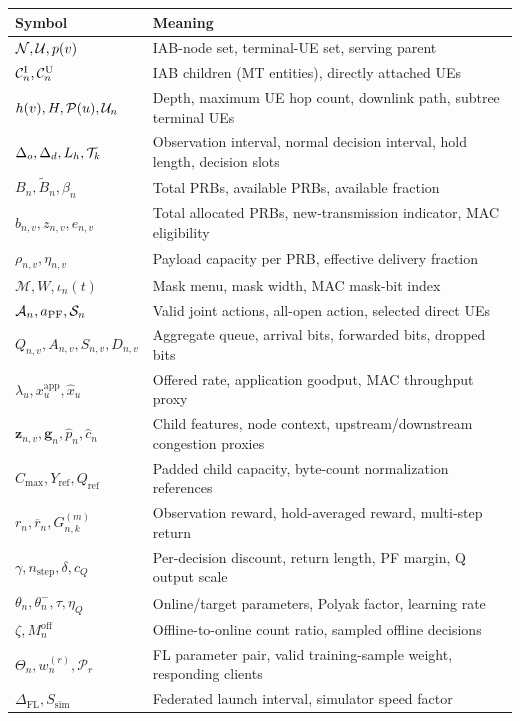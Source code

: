 \begin{EnChapter}
\begin{longtable}{@{}p{}p{}@{}}
\toprule
Symbol & Meaning \\
\midrule
\endhead
$\mathcal{N},\mathcal{U},p(v)$ & IAB-node set, terminal-UE set, serving parent \\
$\mathcal{C}_n^{\mathrm{I}},\mathcal{C}_n^{\mathrm{U}}$ & IAB children (MT entities), directly attached UEs \\
$h(v),H,\mathcal{P}(u),\mathcal{U}_n$ & Depth, maximum UE hop count, downlink path, subtree terminal UEs \\
$\Delta_o,\Delta_d,L_h,\mathcal{T}_k$ & Observation interval, normal decision interval, hold length, decision slots \\
$B_n,\tilde B_n,\beta_n$ & Total PRBs, available PRBs, available fraction \\
$b_{n,v},z_{n,v},e_{n,v}$ & Total allocated PRBs, new-transmission indicator, MAC eligibility \\
$\rho_{n,v},\eta_{n,v}$ & Payload capacity per PRB, effective delivery fraction \\
$\mathcal{M},W,\iota_n(t)$ & Mask menu, mask width, MAC mask-bit index \\
$\mathcal{A}_n,a_{\mathrm{PF}},\mathcal{S}_n$ & Valid joint actions, all-open action, selected direct UEs \\
$Q_{n,v},A_{n,v},S_{n,v},D_{n,v}$ & Aggregate queue, arrival bits, forwarded bits, dropped bits \\
$\lambda_u,x_u^{\mathrm{app}},\widehat x_u$ & Offered rate, application goodput, MAC throughput proxy \\
$\bm z_{n,v},\bm g_n,\hat p_n,\hat c_n$ & Child features, node context, upstream/downstream congestion proxies \\
$C_{\max},Y_{\mathrm{ref}},Q_{\mathrm{ref}}$ & Padded child capacity, byte-count normalization references \\
$r_n,\overline r_n,G_{n,k}^{(m)}$ & Observation reward, hold-averaged reward, multi-step return \\
$\gamma,n_{\mathrm{step}},\delta,c_Q$ & Per-decision discount, return length, PF margin, Q output scale \\
$\theta_n,\theta_n^-,\tau,\eta_Q$ & Online/target parameters, Polyak factor, learning rate \\
$\zeta,M_n^{\mathrm{off}}$ & Offline-to-online count ratio, sampled offline decisions \\
$\Theta_n,w_n^{(r)},\mathcal{P}_r$ & FL parameter pair, valid training-sample weight, responding clients \\
$\Delta_{\mathrm{FL}},S_{\mathrm{sim}}$ & Federated launch interval, simulator speed factor \\
\bottomrule
\end{longtable}

\end{EnChapter}
